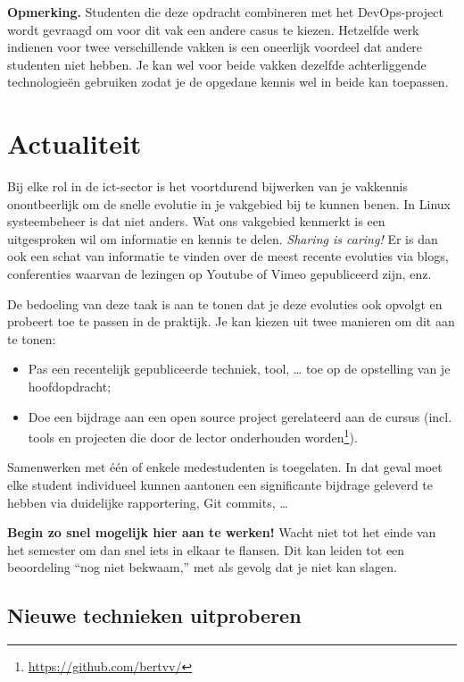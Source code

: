 \textbf{Opmerking.} Studenten die deze opdracht combineren met het DevOps-project wordt gevraagd om voor dit vak een andere casus te kiezen. Hetzelfde werk indienen voor twee verschillende vakken is een oneerlijk voordeel dat andere studenten niet hebben. Je kan wel voor beide vakken dezelfde achterliggende technologieën gebruiken zodat je de opgedane kennis wel in beide kan toepassen.

\section{Actualiteit}
\label{sec:actualiteit}

Bij elke rol in de ict-sector is het voortdurend bijwerken van je vakkennis onontbeerlijk om de snelle evolutie in je vakgebied bij te kunnen benen. In Linux systeembeheer is dat niet anders. Wat ons vakgebied kenmerkt is een uitgesproken wil om informatie en kennis te delen. \emph{Sharing is caring!} Er is dan ook een schat van informatie te vinden over de meest recente evoluties via blogs, conferenties waarvan de lezingen op Youtube of Vimeo gepubliceerd zijn, enz.

De bedoeling van deze taak is aan te tonen dat je deze evoluties ook opvolgt en probeert toe te passen in de praktijk. Je kan kiezen uit twee manieren om dit aan te tonen:

\begin{itemize}
  \item Pas een recentelijk gepubliceerde techniek, tool, \ldots{} toe op de opstelling van je hoofdopdracht;
  \item Doe een bijdrage aan een open source project gerelateerd aan de cursus (incl. tools en projecten die door de lector onderhouden worden\footnote{\url{https://github.com/bertvv/}}).
\end{itemize}

Samenwerken met één of enkele medestudenten is toegelaten. In dat geval moet elke student individueel kunnen aantonen een significante bijdrage geleverd te hebben via duidelijke rapportering, Git commits, \ldots

\textbf{Begin zo snel mogelijk hier aan te werken!} Wacht niet tot het einde van het semester om dan snel iets in elkaar te flansen. Dit kan leiden tot een beoordeling ``nog niet bekwaam,'' met als gevolg dat je niet kan slagen.

\subsection{Nieuwe technieken uitproberen}
\label{subs:nieuwe-technieken-uitproberen}

